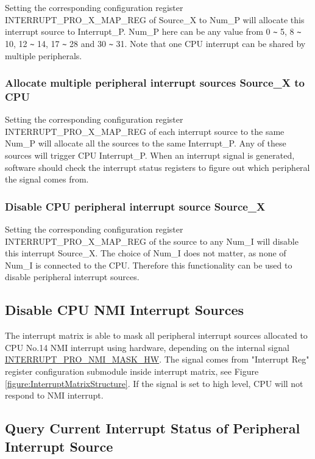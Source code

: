 \documentclass[main\_\_EN.tex]{subfiles}
\begin{document}
Setting the corresponding configuration register INTERRUPT\_PRO\_X\_MAP\_REG of Source\_X to Num\_P will allocate this interrupt source to Interrupt\_P. Num\_P here can be any value from 0 \verb+~+ 5, 8 \verb+~+ 10, 12 \verb+~+ 14, 17 \verb+~+ 28 and 30 \verb+~+ 31. Note that one CPU interrupt can be shared by multiple peripherals.

\subsubsection{Allocate multiple peripheral interrupt sources Source\_X to CPU}

Setting the corresponding configuration register INTERRUPT\_PRO\_X\_MAP\_REG of each interrupt source to the same Num\_P will allocate all the sources to the same Interrupt\_P. Any of these sources will trigger CPU Interrupt\_P. When an interrupt signal is generated, software should check the interrupt status registers to figure out which peripheral the signal comes from.

\subsubsection{Disable CPU peripheral interrupt source Source\_X}
Setting the corresponding configuration register INTERRUPT\_PRO\_X\_MAP\_REG of the source to any Num\_I will disable this interrupt Source\_X. The choice of Num\_I does not matter, as none of Num\_I is connected to the CPU. Therefore this functionality can be used to disable peripheral interrupt sources.


\subsection{Disable CPU NMI Interrupt Sources}

The interrupt matrix is able to mask all peripheral interrupt sources allocated to CPU No.14 NMI interrupt using hardware, depending on the internal signal \hyperref[fielddesc:INTERRUPTPRONMIMASKHW]{INTERRUPT\_PRO\_NMI\_MASK\_HW}. The signal comes from "Interrupt Reg" register configuration submodule inside interrupt matrix, see Figure \ref{figure:InterruptMatrixStructure}. If the signal is set to high level, CPU will not respond to NMI interrupt.


\subsection{Query Current Interrupt Status of Peripheral Interrupt Source}
\end{document}
